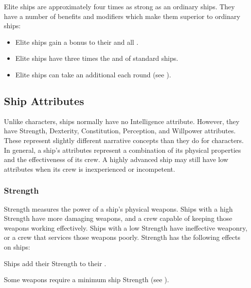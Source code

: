         Elite ships are approximately four times as strong as an ordinary ships.
        They have a number of benefits and modifiers which make them superior to ordinary ships:
        \begin{itemize}
            \item Elite ships gain a  bonus to their  and all .
            \item Elite ships have three times the  and  of standard ships.
            \item Elite ships can take an additional  each round (see ).
        \end{itemize}

    \subsection{Ship Attributes}
        Unlike characters, ships normally have no Intelligence attribute.
        However, they have Strength, Dexterity, Constitution, Perception, and Willpower attributes.
        These represent slightly different narrative concepts than they do for characters.
        In general, a ship's attributes represent a combination of its physical properties and the effectiveness of its crew.
        A highly advanced ship may still have low attributes when its crew is inexperienced or incompetent.

        \subsubsection{Strength}
            Strength measures the power of a ship's physical weapons.
            Ships with a high Strength have more damaging weapons, and a crew capable of keeping those weapons working effectively.
            Ships with a low Strength have ineffective weaponry, or a crew that services those weapons poorly.
            Strength has the following effects on ships:
            \begin{raggeditemize}
                \item Ships add their Strength to their .
                \item Some weapons require a minimum ship Strength (see ).
            \end{raggeditemize}

